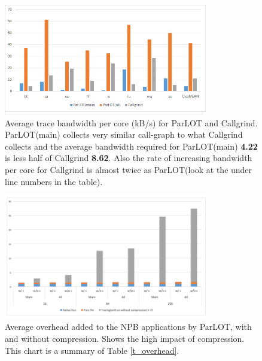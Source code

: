 \begin{table}[]
\centering
\label{t_sd.pin.cg}

\end{table}

\begin{table}[]
\centering
\label{t_ts.cg}

\end{table}


\begin{table}[]
\centering
\label{t_overhead}

\end{table}







\begin{figure}[!t]
\centering
\includegraphics[width=3.5in]{figs.stampede/ts.png}
\caption{Average trace bandwidth per core (kB/s) for ParLOT and Callgrind. ParLOT(main) collects very similar call-graph to what Callgrind collects and the average bandwidth required for ParLOT(main) \textbf{4.22} is less half of Callgrind \textbf{8.62}. Also the rate of increasing bandwidth per core for Callgrind is almost twice as ParLOT(look at the \text under line numbers in the table).  }
\label{ts}
\end{figure}

\begin{figure}[!t]
\centering
\includegraphics[width=3.5in]{figs.stampede/overhead.png}
\caption{
Average overhead added to the NPB applications by ParLOT, with and without compression. Shows the high impact of compression. This chart is a summary of Table \ref{t_overhead}. }
\label{overhead}
\end{figure}

